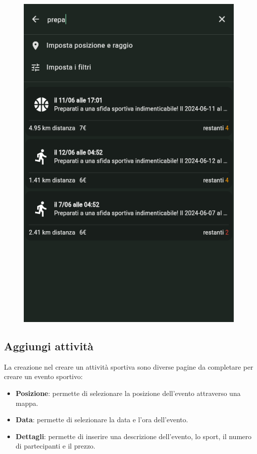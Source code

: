 \documentclass[a4paper,12pt]{article}
\begin{document}
\begin{figure}[h]
\begin{minipage}{0.32\textwidth}
        \includegraphics[width=1\linewidth]{img/search_activity.png}
    \end{minipage}
\end{figure}

\subsection{Aggiungi attività}

La creazione nel creare un attività sportiva sono diverse pagine da completare per creare un evento sportivo:
\begin{itemize}
    \item \textbf{Posizione}: permette di selezionare la posizione dell'evento attraverso una mappa.
    \item \textbf{Data}: permette di selezionare la data e l'ora dell'evento.
    \item \textbf{Dettagli}: permette di inserire una descrizione dell'evento, lo sport, il numero di partecipanti e il prezzo.
\end{itemize}
\end{document}
